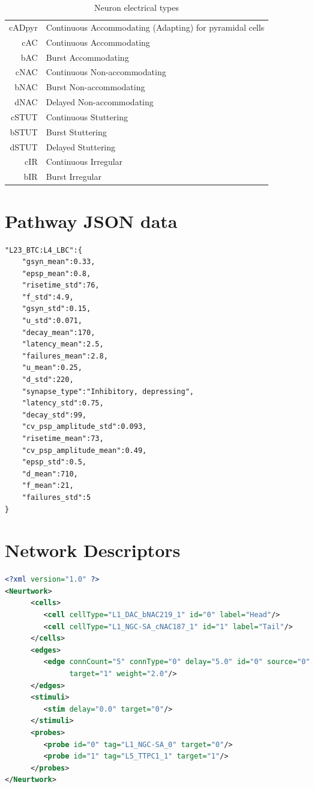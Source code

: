\begin{table}[h]
    \begin{tabular}{r|l}
        cADpyr & Continuous Accommodating (Adapting) for pyramidal cells\\
        cAC & Continuous Accommodating\\
        bAC & Burst Accommodating\\
        cNAC & Continuous Non-accommodating\\
        bNAC & Burst Non-accommodating\\
        dNAC & Delayed Non-accommodating\\
        cSTUT & Continuous Stuttering\\
        bSTUT & Burst Stuttering\\
        dSTUT & Delayed Stuttering\\
        cIR & Continuous Irregular\\
        bIR & Burst Irregular\\
    \end{tabular}
    \caption{Neuron electrical types}
    \label{tab:e-type_table}
\end{table}

\section{Pathway JSON data}
\begin{lstlisting}[caption={Sample JSON entry for pathway physiology}, label={ap:pathPhys}]
"L23_BTC:L4_LBC":{
    "gsyn_mean":0.33,
    "epsp_mean":0.8,
    "risetime_std":76,
    "f_std":4.9,
    "gsyn_std":0.15,
    "u_std":0.071,
    "decay_mean":170,
    "latency_mean":2.5,
    "failures_mean":2.8,
    "u_mean":0.25,
    "d_std":220,
    "synapse_type":"Inhibitory, depressing",
    "latency_std":0.75,
    "decay_std":99,
    "cv_psp_amplitude_std":0.093,
    "risetime_mean":73,
    "cv_psp_amplitude_mean":0.49,
    "epsp_std":0.5,
    "d_mean":710,
    "f_mean":21,
    "failures_std":5
}
\end{lstlisting}

\section{Network Descriptors}

\begin{lstlisting}[language=XML,label=lst:sampleNetXML, caption={Example of 2-cell network generated by NeurGen}]
<?xml version="1.0" ?>
<Neurtwork>
      <cells>
         <cell cellType="L1_DAC_bNAC219_1" id="0" label="Head"/>
         <cell cellType="L1_NGC-SA_cNAC187_1" id="1" label="Tail"/>
      </cells>
      <edges>
         <edge connCount="5" connType="0" delay="5.0" id="0" source="0"
               target="1" weight="2.0"/>
      </edges>
      <stimuli>
         <stim delay="0.0" target="0"/>
      </stimuli>
      <probes>
         <probe id="0" tag="L1_NGC-SA_0" target="0"/>
         <probe id="1" tag="L5_TTPC1_1" target="1"/>
      </probes>
</Neurtwork>
\end{lstlisting}

